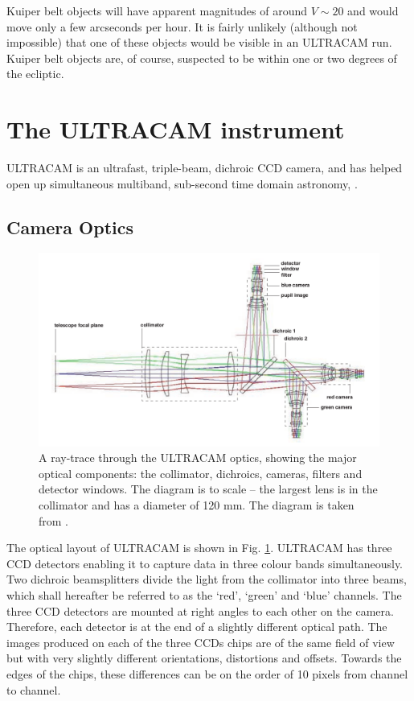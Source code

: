 Kuiper belt objects will have apparent magnitudes of around $V\sim 20$ and would move only a few arcseconds per hour. It is fairly unlikely (although not impossible) that one of these objects would be visible in an ULTRACAM run. Kuiper belt objects are, of course, suspected to be within one or two degrees of the ecliptic. 

\section{The ULTRACAM instrument} 
ULTRACAM is an ultrafast, triple-beam, dichroic CCD camera, and has helped open up simultaneous multiband, sub-second time domain astronomy, \citep{dhillon07}. 

\subsection{Camera Optics}

\begin{figure}
\centering
\includegraphics[width=120mm]{images/ucamoptics.png}
\caption{A ray-trace through the ULTRACAM optics, showing the major optical components: the collimator, dichroics, cameras, filters and detector windows. The diagram is to scale – the largest lens is in the collimator and has a diameter of 120 mm. The diagram is taken from \citet{dhillon07}.}
\label{fig:optics}
\end{figure}

The optical layout of ULTRACAM is shown in Fig. \ref{fig:optics}. ULTRACAM has three CCD detectors enabling it to capture data in three colour bands simultaneously. Two dichroic beamsplitters divide the light from the collimator into three beams, which shall hereafter be referred to as the `red', `green' and `blue' channels. The three CCD detectors are mounted at right angles to each other on the camera. Therefore, each detector is at the end of a slightly different optical path. The images produced on each of the three CCDs chips are of the same field of view but with very slightly different orientations, distortions and offsets. Towards the edges of the chips, these differences can be on the order of 10 pixels from channel to channel. 

